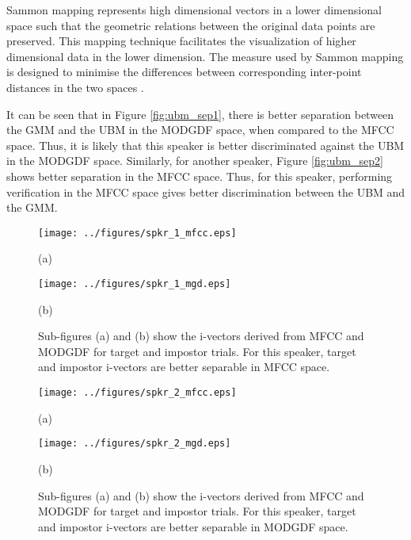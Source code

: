 \documentclass[preprint,12pt,5p]{elsarticle}
\begin{document}
Sammon mapping represents high dimensional vectors in a 
lower dimensional space such that the geometric relations between the original data points
are preserved. This mapping technique facilitates the visualization of higher dimensional data
in the lower dimension. The measure used by Sammon mapping is designed to 
minimise the differences between corresponding inter-point distances in the two spaces \cite{sammon1}. 

It can be seen that in Figure \ref{fig:ubm_sep1}, there is  better separation
between the GMM and the UBM in the MODGDF space, when compared to the MFCC
space. Thus, it is likely that this speaker is better discriminated against the
UBM in the MODGDF space. Similarly, for another speaker, Figure
\ref{fig:ubm_sep2} shows better separation in the MFCC space. Thus, for this
speaker, performing verification in the MFCC space gives better discrimination
between the UBM and the GMM. 

\begin{figure}[h!tb]
\centering 
\begin{minipage}{0.5\textwidth}
\centering 
\texttt{[image: ../figures/spkr\_1\_mfcc.eps]}
\caption*{(a)}
\label{fig:subfig3}
\end{minipage}
\begin{minipage}{0.5\textwidth}
\centering 
\vspace{3mm}
\texttt{[image: ../figures/spkr\_1\_mgd.eps]}
\caption*{(b)}
\label{fig:subfig4}
\end{minipage}
\caption{Sub-figures (a) and (b) show the i-vectors derived from MFCC
and MODGDF for target and impostor trials. For this speaker, target and impostor
i-vectors are better separable in MFCC space.}
\label{fig:ivec_separation1}
\end{figure}

\begin{figure}[h!tb]
\centering 
\begin{minipage}{0.5\textwidth}
\centering 
\texttt{[image: ../figures/spkr\_2\_mfcc.eps]}
\caption*{(a)}
\label{fig:subfig5}
\end{minipage}
\begin{minipage}{0.5\textwidth}
\centering 
\vspace{3mm}
\texttt{[image: ../figures/spkr\_2\_mgd.eps]}
\caption*{(b)}
\label{fig:subfig6}
\end{minipage}
\caption{Sub-figures (a) and (b) show the i-vectors derived from MFCC
and MODGDF for target and impostor trials. For this speaker, target and impostor
i-vectors are better separable in MODGDF space.}
\label{fig:ivec_separation2}
\end{figure}
\end{document}
